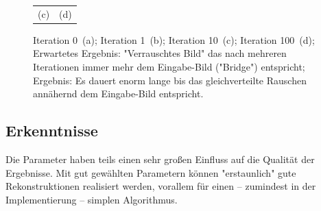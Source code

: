 \documentclass[german,notitlepage,smartquotes]{hgbreport}
\begin{document}
\begin{figure}[h]
\begin{tabular}{cc}
		(c) & (d)
	\end{tabular}
	\caption{Iteration 0~(a); Iteration 1~(b); Iteration 10~(c); Iteration 100~(d); Erwartetes Ergebnis: "Verrauschtes Bild" das nach mehreren Iterationen immer mehr dem Eingabe-Bild ("Bridge") entspricht; Ergebnis: Es dauert enorm lange bis das gleichverteilte Rauschen annähernd dem Eingabe-Bild entspricht.}
	\label{ex-15-bridge}
\end{figure}


\clearpage

\subsection{Erkenntnisse}

Die Parameter haben teils einen sehr großen Einfluss auf die Qualität der Ergebnisse. Mit gut gewählten Parametern können "erstaunlich" gute Rekonstruktionen realisiert werden, vorallem für einen -- zumindest in der Implementierung -- simplen Algorithmus.








\end{document}
